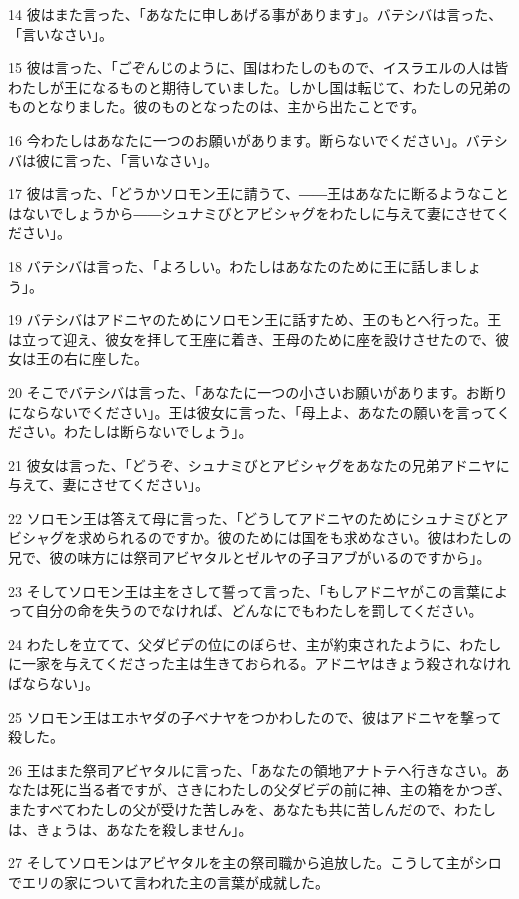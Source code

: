 \par 14 彼はまた言った、「あなたに申しあげる事があります」。バテシバは言った、「言いなさい」。
\par 15 彼は言った、「ごぞんじのように、国はわたしのもので、イスラエルの人は皆わたしが王になるものと期待していました。しかし国は転じて、わたしの兄弟のものとなりました。彼のものとなったのは、主から出たことです。
\par 16 今わたしはあなたに一つのお願いがあります。断らないでください」。バテシバは彼に言った、「言いなさい」。
\par 17 彼は言った、「どうかソロモン王に請うて、――王はあなたに断るようなことはないでしょうから――シュナミびとアビシャグをわたしに与えて妻にさせてください」。
\par 18 バテシバは言った、「よろしい。わたしはあなたのために王に話しましょう」。
\par 19 バテシバはアドニヤのためにソロモン王に話すため、王のもとへ行った。王は立って迎え、彼女を拝して王座に着き、王母のために座を設けさせたので、彼女は王の右に座した。
\par 20 そこでバテシバは言った、「あなたに一つの小さいお願いがあります。お断りにならないでください」。王は彼女に言った、「母上よ、あなたの願いを言ってください。わたしは断らないでしょう」。
\par 21 彼女は言った、「どうぞ、シュナミびとアビシャグをあなたの兄弟アドニヤに与えて、妻にさせてください」。
\par 22 ソロモン王は答えて母に言った、「どうしてアドニヤのためにシュナミびとアビシャグを求められるのですか。彼のためには国をも求めなさい。彼はわたしの兄で、彼の味方には祭司アビヤタルとゼルヤの子ヨアブがいるのですから」。
\par 23 そしてソロモン王は主をさして誓って言った、「もしアドニヤがこの言葉によって自分の命を失うのでなければ、どんなにでもわたしを罰してください。
\par 24 わたしを立てて、父ダビデの位にのぼらせ、主が約束されたように、わたしに一家を与えてくださった主は生きておられる。アドニヤはきょう殺されなければならない」。
\par 25 ソロモン王はエホヤダの子ベナヤをつかわしたので、彼はアドニヤを撃って殺した。
\par 26 王はまた祭司アビヤタルに言った、「あなたの領地アナトテへ行きなさい。あなたは死に当る者ですが、さきにわたしの父ダビデの前に神、主の箱をかつぎ、またすべてわたしの父が受けた苦しみを、あなたも共に苦しんだので、わたしは、きょうは、あなたを殺しません」。
\par 27 そしてソロモンはアビヤタルを主の祭司職から追放した。こうして主がシロでエリの家について言われた主の言葉が成就した。
